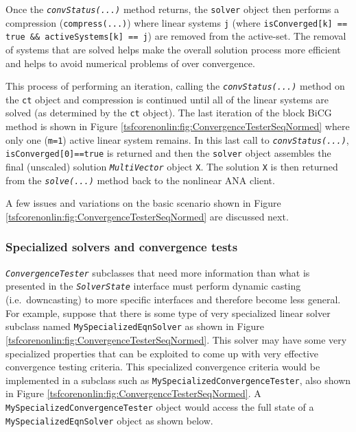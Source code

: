 Once the \texttt{\textit{convStatus(...)}} method returns, the
\texttt{solver} object then performs a compression (\texttt{compress(...)})
where linear systems \texttt{j} (where \texttt{isConverged[k] == true
\&\& activeSystems[k] == j}) are removed from the active-set.  The
removal of systems that are solved helps make the overall solution
process more efficient and helps to avoid numerical problems of
over convergence.

This process of performing an iteration, calling the
\texttt{\textit{convStatus(...)}} method on the \texttt{ct}
object and compression is continued until all of the linear systems are
solved (as determined by the \texttt{ct} object).  The last 
iteration of the block BiCG method is shown in Figure 
\ref{tsfcorenonlin:fig:ConvergenceTesterSeqNormed} where only one (\texttt{m=1})
active linear system remains.  In this last call to
\texttt{\textit{convStatus(...)}}, \texttt{isConverged[0]==true}
is returned and then the \texttt{solver} object assembles the final
(unscaled) solution \texttt{\textit{MultiVector}} object \texttt{X}.
The solution \texttt{X} is then returned from the
\texttt{\textit{solve(...)}} method back to the nonlinear ANA client.

A few issues and variations on the basic scenario shown in Figure
\ref{tsfcorenonlin:fig:ConvergenceTesterSeqNormed} are discussed next.

%
\subsubsection*{Specialized solvers and convergence tests}
%

\texttt{\textit{ConvergenceTester}} subclasses that need more information
than what is presented in the \texttt{\textit{Solver\-State}}
interface must perform dynamic casting (i.e.~downcasting) to more
specific interfaces and therefore become less general.  For example,
suppose that there is some type of very specialized linear solver
subclass named \texttt{My\-Specialized\-Eqn\-Solver} as shown in Figure
\ref{tsfcorenonlin:fig:ConvergenceTesterSeqNormed}.  This solver
may have some very specialized properties that can be exploited to
come up with very effective convergence testing criteria.  This
specialized convergence criteria would be implemented in a subclass
such as \texttt{My\-Specialized\-Convergence\-Tester}, also shown in
Figure \ref{tsfcorenonlin:fig:ConvergenceTesterSeqNormed}.  A
\texttt{My\-Specialized\-Convergence\-Tester} object would access the
full state of a \texttt{My\-Specialized\-Eqn\-Solver} object as shown below.

